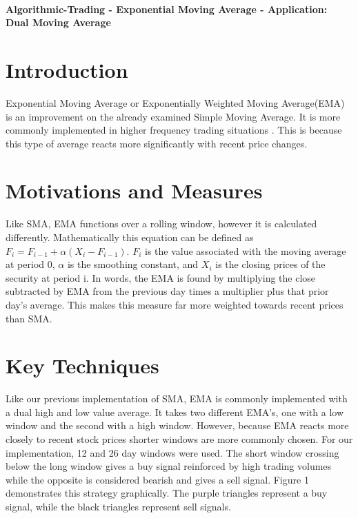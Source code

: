 \documentclass[letterpaper,11pt]{article}
\begin{document}
\thispagestyle{plain}


 \\

\noindent\textbf{Algorithmic-Trading - Exponential Moving Average - Application: Dual Moving Average}

\section*{Introduction }

Exponential Moving Average or Exponentially Weighted Moving Average(EMA) is an improvement on the already examined Simple Moving Average. It is more commonly implemented in higher frequency trading situations \cite{James1968}. This is because this type of average reacts more significantly with recent price changes. 

\section*{Motivations and Measures}

Like SMA, EMA functions over a rolling window, however it is calculated differently. Mathematically this equation can be defined as  $F_i = F_{i-1} +\alpha(X_i - F_{i-1})$\cite{James1968}. $F_i$ is the value associated with the moving average at period 0, $\alpha$ is the smoothing constant, and $X_i$ is the closing prices of the security at period i. In words, the EMA is found by multiplying the close subtracted by EMA from the previous day times a multiplier plus that prior day's average. This makes this measure far more weighted towards recent prices than SMA. 

\section*{Key Techniques}

Like our previous implementation of SMA, EMA is commonly implemented with a dual high and low value average. It takes two different EMA's, one with a low window and the second with a high window. However, because EMA reacts more closely to recent stock prices shorter windows are more commonly chosen. For our implementation, 12 and 26 day windows were used. The short window crossing below the long window gives a buy signal reinforced by high trading volumes while the opposite is considered bearish and gives a sell signal. Figure 1 demonstrates this strategy graphically. The purple triangles represent a buy signal, while the black triangles represent sell signals.
\end{document}
